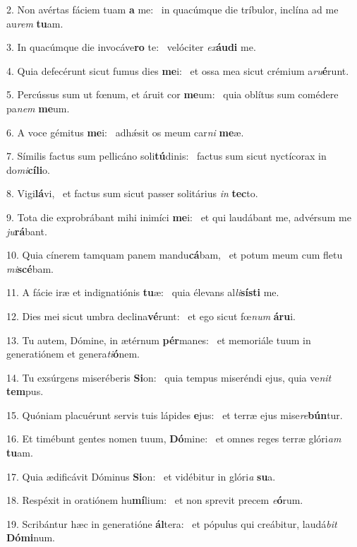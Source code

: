 2. Non avértas fáciem tuam \textbf{a} me: \ast\  in quacúmque die tríbulor, inclína ad me au\textit{rem} \textbf{tu}am.\

3. In quacúmque die invocáve\textbf{ro} te: \ast\  velóciter \textit{ex}\textbf{áu}\textbf{di} me.\

4. Quia defecérunt sicut fumus dies \textbf{me}i: \ast\  et ossa mea sicut crémium a\textit{ru}\textbf{é}runt.\

5. Percússus sum ut fœnum, et áruit cor \textbf{me}um: \ast\  quia oblítus sum comédere pa\textit{nem} \textbf{me}um.\

6. A voce gémitus \textbf{me}i: \ast\  adhǽsit os meum car\textit{ni} \textbf{me}æ.\

7. Símilis factus sum pellicáno soli\textbf{tú}dinis: \ast\  factus sum sicut nyctícorax in do\textit{mi}\textbf{cí}\textbf{li}o.\

8. Vigi\textbf{lá}vi, \ast\  et factus sum sicut passer solitárius \textit{in} \textbf{tec}to.\

9. Tota die exprobrábant mihi inimíci \textbf{me}i: \ast\  et qui laudábant me, advérsum me \textit{ju}\textbf{rá}bant.\

10. Quia cínerem tamquam panem mandu\textbf{cá}bam, \ast\  et potum meum cum fletu \textit{mi}\textbf{scé}bam.\

11. A fácie iræ et indignatiónis \textbf{tu}æ: \ast\  quia élevans al\textit{li}\textbf{sís}\textbf{ti} me.\

12. Dies mei sicut umbra declina\textbf{vé}runt: \ast\  et ego sicut fœ\textit{num} \textbf{á}\textbf{ru}i.\

13. Tu autem, Dómine, in ætérnum \textbf{pér}manes: \ast\  et memoriále tuum in generatiónem et genera\textit{ti}\textbf{ó}nem.\

14. Tu exsúrgens miseréberis \textbf{Si}on: \ast\  quia tempus miseréndi ejus, quia ve\textit{nit} \textbf{tem}pus.\

15. Quóniam placuérunt servis tuis lápides \textbf{e}jus: \ast\  et terræ ejus mise\textit{re}\textbf{bún}tur.\

16. Et timébunt gentes nomen tuum, \textbf{Dó}mine: \ast\  et omnes reges terræ glóri\textit{am} \textbf{tu}am.\

17. Quia ædificávit Dóminus \textbf{Si}on: \ast\  et vidébitur in glóri\textit{a} \textbf{su}a.\

18. Respéxit in oratiónem hu\textbf{mí}lium: \ast\  et non sprevit precem \textit{e}\textbf{ó}rum.\

19. Scribántur hæc in generatióne \textbf{ál}tera: \ast\  et pópulus qui creábitur, laudá\textit{bit} \textbf{Dó}\textbf{mi}num.\

